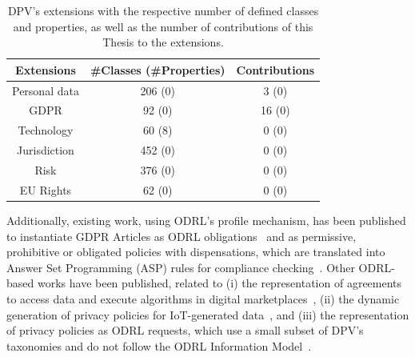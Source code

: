 \begin{table}[htbp]
\centering
\caption[DPV's extensions.]{DPV's extensions with the respective number of defined classes and properties, as well as the number of contributions of this Thesis to the extensions.}
\label{tab:dpv_extensions_contributions} 
\begin{tabular}{ c||c|c}
 Extensions & \#Classes (\#Properties)  & Contributions \\
 \hline\hline
 Personal data & 206 (0) & 3 (0) \\
 \hline
 GDPR & 92 (0) & 16 (0) \\
 \hline
 Technology & 60 (8) & 0 (0) \\
 \hline
 Jurisdiction & 452 (0) & 0 (0) \\
 \hline
 Risk & 376 (0) & 0 (0) \\
 \hline
 EU Rights & 62 (0) & 0 (0) \\
\end{tabular}
\end{table}

Additionally, existing work, using ODRL's profile mechanism, has been published to instantiate GDPR Articles as ODRL obligations~\citep{agarwal_legislative_2018} and as permissive, prohibitive or obligated policies with dispensations, which are translated into Answer Set Programming (ASP) rules for compliance checking~\citep{de_vos_odrl_2019}.
Other ODRL-based works have been published, related to (i) the representation of agreements to access data and execute algorithms in digital marketplaces~\citep{shakeri_modeling_2019}, (ii) the dynamic generation of privacy policies for IoT-generated data~\citep{canobenito_injecting_2023}, and (iii) the representation of privacy policies as ODRL requests, which use a small subset of DPV's taxonomies and do not follow the ODRL Information Model~\citep{krasnashchok_towards_2020}.